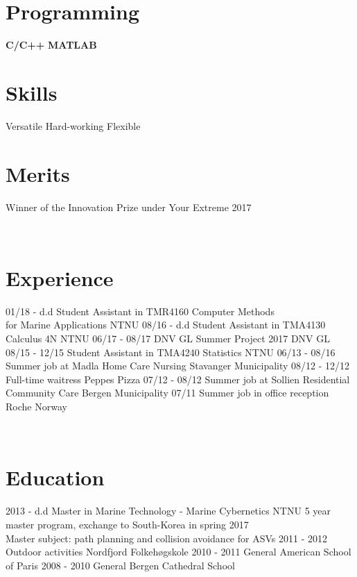 \documentclass[]{friggeri-cv}
\begin{document}
\begin{aside}
  \section{Programming}
       \textbf{C/C++}
       \textbf{MATLAB} 
    ~
  \section{Skills}
    Versatile
    Hard-working
    Flexible
    ~
  \section{Merits}
    Winner of the Innovation Prize under Your Extreme 2017 
\end{aside}
~
\vspace{5mm}
\section{Experience}
\begin{entrylist}
  \entry
    {01/18 - d.d}
    {Student Assistant in TMR4160 Computer Methods \\for Marine Applications}
    {NTNU}
    {}
  \entry
    {08/16 - d.d}
    {Student Assistant in TMA4130 Calculus 4N}
    {NTNU}
    {}
   \entry
    {06/17 - 08/17}
    {DNV GL Summer Project 2017}
    {DNV GL \vspace{1.5mm}}
    {%
    }
  \entry
    {08/15 - 12/15}
    {Student Assistant in TMA4240 Statistics}
    {NTNU}
    {}
    \entry
    {06/13 - 08/16}
    {Summer job at Madla Home Care Nursing}
    {Stavanger Municipality}
    {}
    \entry
    {08/12 - 12/12}
    {Full-time waitress}
    {Peppes Pizza}
    {}
    \entry
    {07/12 - 08/12}
    {Summer job at Sollien Residential Community Care}
    {Bergen Municipality}
    {}
    \entry
    {07/11}
    {Summer job in office reception}
    {Roche Norway}
    {}
\end{entrylist}
\\
\section{Education}
\begin{entrylist}
  \entry
    {2013 - d.d}
    {Master in Marine Technology - Marine Cybernetics}
    {NTNU}
    {5 year master program, exchange to South-Korea in spring 2017\\
    Master subject: path planning and collision avoidance for ASVs\vspace{2mm}}
  \entry
    {2011 - 2012}
    {Outdoor activities}
    {Nordfjord Folkehøgskole}
    {}
  \entry
    {2010 - 2011}
    {General}
    {American School of Paris}
    {}
\entry
    {2008 - 2010}
    {General}
    {Bergen Cathedral School}
    {}
\end{entrylist}
\end{document}
